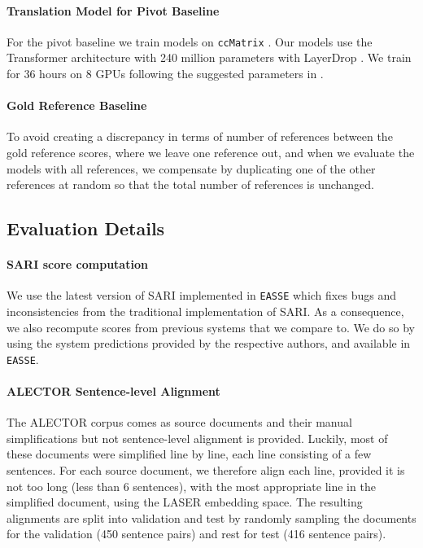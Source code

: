 \documentclass[11pt]{article}
\newcommand{\alector}{ALECTOR\xspace}
\newcommand{\laser}{LASER\xspace}
\begin{document}
\paragraph{Translation Model for Pivot Baseline}
For the pivot baseline we train models on \texttt{ccMatrix} \cite{schwenk2019ccmatrix}. Our models use the Transformer architecture with 240 million parameters with LayerDrop \cite{fan2019reducing}.
We train for 36 hours on 8 GPUs following the suggested parameters in \citet{ott2019fairseq}.

\paragraph{Gold Reference Baseline}
To avoid creating a discrepancy in terms of number of references between the gold reference scores, where we leave one reference out, and when we evaluate the models with all references, we compensate by duplicating one of the other references at random so that the total number of references is unchanged.

\subsection{Evaluation Details} \label{subsection:evaluation_details}


\paragraph{SARI score computation}
We use the latest version of SARI implemented in \texttt{EASSE} \cite{alva2019easse} which fixes bugs and inconsistencies from the traditional implementation of SARI. As a consequence, we also recompute scores from previous systems that we compare to. We do so by using the system predictions provided by the respective authors, and available in \texttt{EASSE}.

\paragraph{\alector Sentence-level Alignment}
The \alector corpus comes as source documents and their manual simplifications but not sentence-level alignment is provided.
Luckily, most of these documents were simplified line by line, each line consisting of a few sentences.
For each source document, we therefore align each line, provided it is not too long (less than 6 sentences), with the most appropriate line in the simplified document, using the \laser embedding space.
The resulting alignments are split into validation and test by randomly sampling the documents for the validation (450 sentence pairs) and rest for test (416 sentence pairs). 
\end{document}
